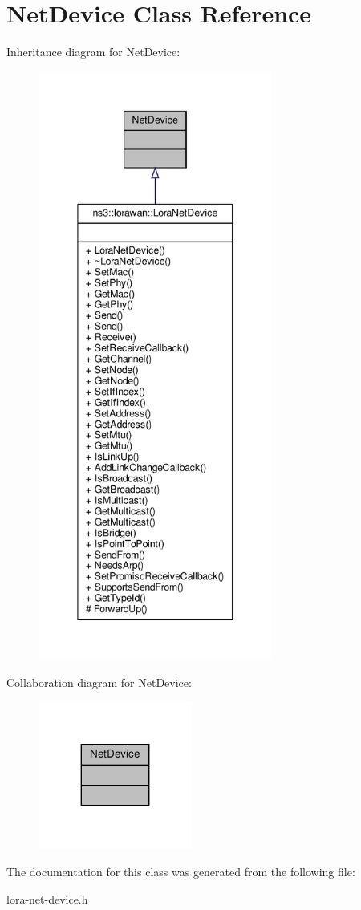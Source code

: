 \hypertarget{classNetDevice}{}\section{Net\+Device Class Reference}
\label{classNetDevice}


Inheritance diagram for Net\+Device\+:
\nopagebreak
\begin{figure}[H]
\begin{center}
\leavevmode
\includegraphics[height=550pt]{classNetDevice__inherit__graph}
\end{center}
\end{figure}


Collaboration diagram for Net\+Device\+:
\nopagebreak
\begin{figure}[H]
\begin{center}
\leavevmode
\includegraphics[width=143pt]{classNetDevice__coll__graph}
\end{center}
\end{figure}


The documentation for this class was generated from the following file\+:\begin{DoxyCompactItemize}
\item 
lora-\/net-\/device.\+h\end{DoxyCompactItemize}
